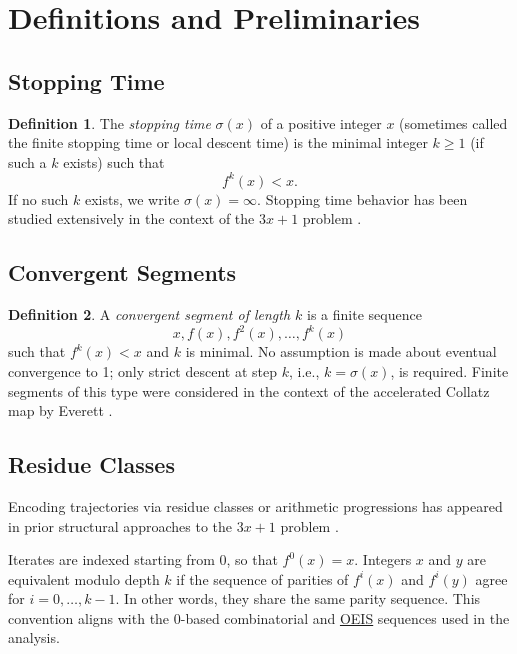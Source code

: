 \documentclass[12pt, oneside]{article}   	%
\numberwithin{equation}{section}          %
\theoremstyle{definition}
\newtheorem{define}{Definition}[section]
\begin{document}
\newpage
\section{Definitions and Preliminaries}
\label{sec:definitions}

\subsection{Stopping Time}

\begin{define}
The \emph{stopping time} \( \sigma(x) \) of a positive integer \(x\) (sometimes called the finite
stopping time or local descent time) is the minimal integer
\(k \ge 1\) (if such a \(k\) exists) such that
\[
f^k(x) < x.
\]
If no such \(k\) exists, we write \(\sigma(x) = \infty\). Stopping time behavior has been studied
extensively in the context of the $3x+1$ problem \cite{Terras1976}.
\end{define}


\subsection{Convergent Segments}

\begin{define}
A \emph{convergent segment of length \(k\)} is a finite sequence
\[
x, f(x), f^2(x), \ldots, f^k(x)
\]
such that \( f^k(x) < x \) and \(k\) is minimal. No assumption is made about eventual
convergence to 1; only strict descent at step \(k\), i.e., \(k = \sigma(x)\), is required.
Finite segments of this type were considered in the context of the accelerated Collatz map
by Everett \cite{Everett1977}.
\end{define}


\subsection{Residue Classes}

Encoding trajectories via residue classes or arithmetic progressions has appeared in prior
structural approaches to the $3x+1$ problem \cite{Wirsching1998,Chamberland2003}.

\medskip
Iterates are indexed starting from \(0\), so that \(f^0(x)=x\). 
Integers \(x\) and \(y\) are equivalent modulo depth \(k\) if the sequence of parities 
of \(f^i(x)\) and \(f^i(y)\) agree for \(i=0,\dots,k-1\). 
In other words, they share the same parity sequence. 
This convention aligns with
the 0-based combinatorial and \href{https://oeis.org}{OEIS} sequences used in the analysis.
\end{document}
